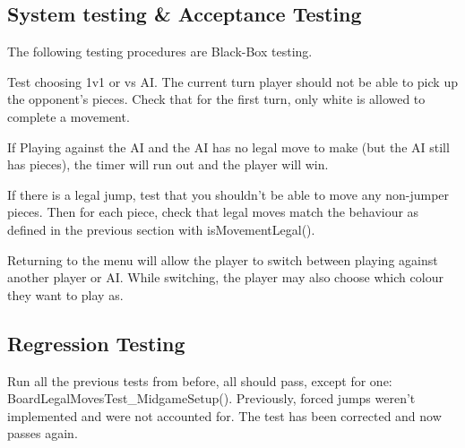 \documentclass{article}
\begin{document}
\subsection{System testing \& Acceptance Testing}
The following testing procedures are Black-Box testing.

Test choosing 1v1 or vs AI.
The current turn player should not be able to pick up the opponent's pieces.
Check that for the first turn, only white is allowed to complete a movement.

If Playing against the AI and the AI has no legal move to make (but the AI still has pieces), the timer will run out and the player will win.

If there is a legal jump, test that you shouldn't be able to move any non-jumper pieces.
Then for each piece, check that legal moves match the behaviour as defined in the previous section with isMovementLegal().

Returning to the menu will allow the player to switch between playing against another player or AI. 
While switching, the player may also choose which colour they want to play as.


\subsection{Regression Testing}
Run all the previous tests from before, all should pass, except for one: BoardLegalMovesTest\_MidgameSetup().
Previously, forced jumps weren't implemented and were not accounted for. The test has been corrected and now passes again.
\end{document}
